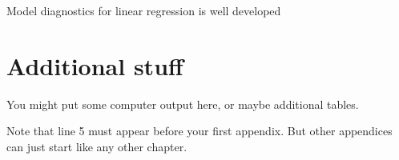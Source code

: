 \documentclass{monashthesis}
\begin{document}
Model diagnostics for linear regression is well developed

\appendix

\hypertarget{additional-stuff}{%
\chapter{Additional stuff}\label{additional-stuff}}

You might put some computer output here, or maybe additional tables.

Note that line 5 must appear before your first appendix. But other appendices can just start like any other chapter.

\printbibliography[heading=bibintoc]
\end{document}
